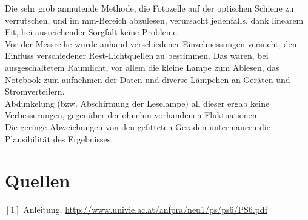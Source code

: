 \documentclass[12pt,a4paper]{article}
\begin{document}
\begin{multicols}{2}
Die sehr grob anmutende Methode, die Fotozelle auf der optischen Schiene zu verrutschen, und im mm-Bereich abzulesen, verursacht jedenfalls, dank linearem Fit, bei ausreichender Sorgfalt keine Probleme.\\
Vor der Messreihe wurde anhand verschiedener Einzelmessungen versucht, den Einfluss verschiedener Rest-Lichtquellen zu bestimmen. Das waren, bei ausgeschaltetem Raumlicht, vor allem die kleine Lampe zum Ablesen, das Notebook zum aufnehmen der Daten und diverse Lämpchen an Geräten und Stromverteilern.\\ Abdunkelung (bzw. Abschirmung der Leselampe) all dieser ergab keine Verbesserungen, gegenüber der ohnehin vorhandenen Fluktuationen.\\

Die geringe Abweichungen von den gefitteten Geraden untermauern die Plausibilität des Ergebnisses.


\section{Quellen}
$[1]$ Anleitung, \url{http://www.univie.ac.at/anfpra/neu1/ps/ps6/PS6.pdf}\\

\end{multicols}
\end{document}
